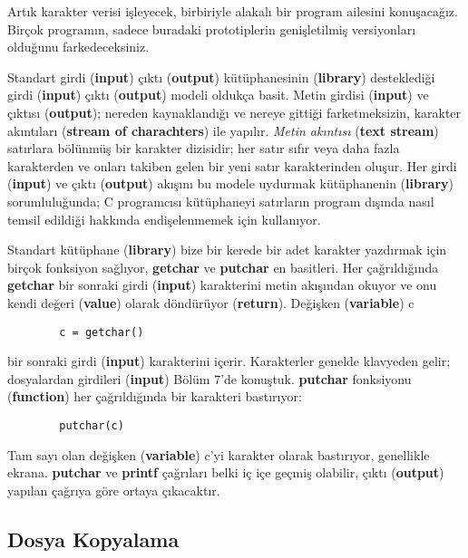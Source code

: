 \documentclass[a4paper,12pt,oneside]{book}
\begin{document}
Artık karakter verisi işleyecek, birbiriyle alakalı bir program ailesini konuşacağız. Birçok programın, sadece buradaki prototiplerin genişletilmiş versiyonları olduğunu farkedeceksiniz.
\par Standart girdi (\textbf{input}) çıktı (\textbf{output}) kütüphanesinin (\textbf{library}) desteklediği girdi (\textbf{input}) çıktı (\textbf{output}) modeli oldukça basit. Metin girdisi (\textbf{input}) ve çıktısı (\textbf{output}); nereden kaynaklandığı ve nereye gittiği farketmeksizin, karakter akıntıları (\textbf{stream of charachters}) ile yapılır. \textit{Metin akıntısı} (\textbf{text stream}) satırlara bölünmüş bir karakter dizisidir; her satır sıfır veya daha fazla karakterden ve onları takiben gelen bir yeni satır karakterinden oluşur. Her girdi (\textbf{input}) ve çıktı (\textbf{output}) akışını bu modele uydurmak kütüphanenin (\textbf{library}) sorumluluğunda; C programcısı kütüphaneyi satırların program dışında nasıl temsil edildiği hakkında endişelenmemek için kullanıyor.
\par Standart kütüphane (\textbf{library}) bize bir kerede bir adet karakter yazdırmak için birçok fonksiyon sağlıyor, \textbf{getchar} ve \textbf{putchar} en basitleri. Her çağrıldığında \textbf{getchar} bir sonraki girdi (\textbf{input}) karakterini metin akışından okuyor ve onu kendi değeri (\textbf{value}) olarak döndürüyor (\textbf{return}). Değişken (\textbf{variable}) c
\begin{lstlisting}
		c = getchar()
\end{lstlisting}
bir sonraki girdi (\textbf{input}) karakterini içerir. Karakterler genelde klavyeden gelir; dosyalardan girdileri (\textbf{input}) Bölüm 7'de konuştuk.
\textbf{putchar} fonksiyonu (\textbf{function}) her çağrıldığında bir karakteri bastırıyor:
\begin{lstlisting}
		putchar(c)
\end{lstlisting}
Tam sayı olan değişken (\textbf{variable}) c'yi karakter olarak bastırıyor, genellikle ekrana. \textbf{putchar} ve \textbf{printf} çağrıları belki iç içe geçmiş olabilir, çıktı (\textbf{output}) yapılan çağrıya göre ortaya çıkacaktır. \pagebreak

\subsection{Dosya Kopyalama}
\end{document}
